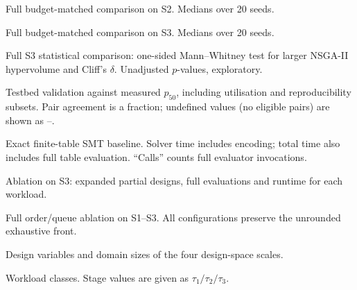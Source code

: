 \documentclass[preprint,11pt,3p]{elsarticle}
\theoremstyle{plain}
\theoremstyle{definition}
\begin{document}
\begin{table}[!htbp]\centering
\caption{Full budget-matched comparison on S2. Medians over 20 seeds.}

\end{table}

\begin{table}[!htbp]\centering
\caption{Full budget-matched comparison on S3. Medians over 20 seeds.}

\end{table}
\clearpage

\begin{table}[!htbp]\centering
\caption{Full S3 statistical comparison: one-sided Mann--Whitney test for larger NSGA-II
hypervolume and Cliff's $\delta$. Unadjusted $p$-values, exploratory.}

\end{table}

\begin{table}[!htbp]\centering
\caption{Testbed validation against measured $p_{50}$, including utilisation and
reproducibility subsets. Pair agreement is a fraction; undefined values (no eligible
pairs) are shown as --.}

\end{table}
\clearpage

\begin{table}[!htbp]\centering
\caption{Exact finite-table SMT baseline. Solver time includes encoding; total time also
includes full table evaluation. ``Calls'' counts full evaluator invocations.}

\end{table}

\begin{table}[!htbp]\centering
\caption{Ablation on S3: expanded partial designs, full evaluations and runtime for each
workload.}

\end{table}
\clearpage

\begin{table}[!htbp]\centering
\caption{Full order/queue ablation on S1--S3. All configurations preserve the unrounded
exhaustive front.}

\end{table}
\clearpage

\begin{table}[!htbp]\centering
\caption{Design variables and domain sizes of the four design-space scales.}

\end{table}

\begin{table}[!htbp]\centering
\caption{Workload classes. Stage values are given as $\tau_1/\tau_2/\tau_3$.}

\end{table}
\end{document}
